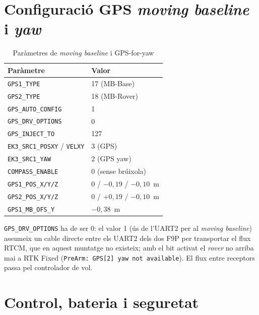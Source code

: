 \section{Configuració GPS \emph{moving baseline} i \emph{yaw}}
\label{subsec:gps-moving-baseline}

\begin{table}[H]
    \centering
    \caption{Paràmetres de \emph{moving baseline} i GPS-for-yaw}
    \label{tab:params-gps-mb}
    \begin{tabular}{ll}
        \toprule
        Paràmetre & Valor \\
        \midrule
        \texttt{GPS1\_TYPE} & 17 (MB-Base) \\
        \texttt{GPS2\_TYPE} & 18 (MB-Rover) \\
        \texttt{GPS\_AUTO\_CONFIG} & 1 \\
        \texttt{GPS\_DRV\_OPTIONS} & 0 \\
        \texttt{GPS\_INJECT\_TO} & 127 \\
        \texttt{EK3\_SRC1\_POSXY} / \texttt{VELXY} & 3 (GPS) \\
        \texttt{EK3\_SRC1\_YAW} & 2 (GPS yaw) \\
        \texttt{COMPASS\_ENABLE} & 0 (sense brúixola) \\
        \texttt{GPS1\_POS\_X/Y/Z} & $0$ / $-0{,}19$ / $-0{,}10$~m \\
        \texttt{GPS2\_POS\_X/Y/Z} & $0$ / $+0{,}19$ / $-0{,}10$~m \\
        \texttt{GPS1\_MB\_OFS\_Y} & $-0{,}38$~m \\
        \bottomrule
    \end{tabular}
\end{table}

\texttt{GPS\_DRV\_OPTIONS} ha de ser 0: el valor 1 (ús de l'UART2 per al \emph{moving baseline}) assumeix un cable directe entre els UART2 dels dos F9P per transportar el flux RTCM, que en aquest muntatge no existeix; amb el bit activat el \emph{rover} no arriba mai a RTK Fixed (\texttt{PreArm: GPS[2] yaw not available}). El flux entre receptors passa pel controlador de vol.

\section{Control, bateria i seguretat}
\label{sec:params-control}

